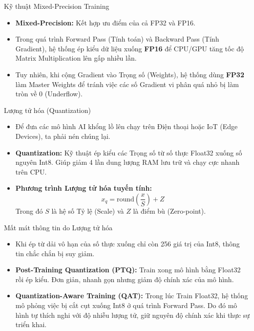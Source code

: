 \documentclass[aspectratio=169]{beamer}
\begin{document}
\begin{frame}{Kỹ thuật Mixed-Precision Training}
    \begin{itemize}
        \item \textbf{Mixed-Precision:} Kết hợp ưu điểm của cả FP32 và FP16.
        \item Trong quá trình Forward Pass (Tính toán) và Backward Pass (Tính Gradient), hệ thống ép kiểu dữ liệu xuống \textbf{FP16} để CPU/GPU tăng tốc độ Matrix Multiplication lên gấp nhiều lần.
        \item Tuy nhiên, khi cộng Gradient vào Trọng số (Weights), hệ thống dùng \textbf{FP32} làm Master Weights để tránh việc các số Gradient vi phân quá nhỏ bị làm tròn về $0$ (Underflow).
    \end{itemize}
\end{frame}

\begin{frame}{Lượng tử hóa (Quantization)}
    \begin{itemize}
        \item Để đưa các mô hình AI khổng lồ lên chạy trên Điện thoại hoặc IoT (Edge Devices), ta phải nén chúng lại.
        \item \textbf{Quantization:} Kỹ thuật ép kiểu các Trọng số từ số thực Float32 xuống số nguyên Int8. Giúp giảm 4 lần dung lượng RAM lưu trữ và chạy cực nhanh trên CPU.
        \item \textbf{Phương trình Lượng tử hóa tuyến tính:}
        $$ x_q = \text{round}\left(\frac{x}{S}\right) + Z $$
        Trong đó $S$ là hệ số Tỷ lệ (Scale) và $Z$ là điểm bù (Zero-point).
    \end{itemize}
\end{frame}

\begin{frame}{Mất mát thông tin do Lượng tử hóa}
    \begin{itemize}
        \item Khi ép từ dải vô hạn của số thực xuống chỉ còn 256 giá trị của Int8, thông tin chắc chắn bị suy giảm.
        \item \textbf{Post-Training Quantization (PTQ):} Train xong mô hình bằng Float32 rồi ép kiểu. Đơn giản, nhanh gọn nhưng giảm độ chính xác của mô hình.
        \item \textbf{Quantization-Aware Training (QAT):} Trong lúc Train Float32, hệ thống mô phỏng việc bị cắt cụt xuống Int8 ở quá trình Forward Pass. Do đó mô hình tự thích nghi với độ nhiễu lượng tử, giữ nguyên độ chính xác khi thực sự triển khai.
    \end{itemize}
\end{frame}
\end{document}
